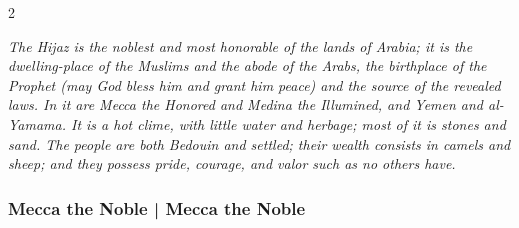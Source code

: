 \documentclass[11pt,a4paper]{article}
\begin{document}
\begin{paracol}{2}

\switchcolumn[0]
\begin{flushright}
{\small\arabicfont
{}}
\end{flushright}

\switchcolumn[1]
\begin{flushleft}
\small
\textit{The Hijaz is the noblest and most honorable of the lands of Arabia; it is the dwelling-place of the Muslims and the abode of the Arabs, the birthplace of the Prophet (may God bless him and grant him peace) and the source of the revealed laws. In it are Mecca the Honored and Medina the Illumined, and Yemen and al-Yamama. It is a hot clime, with little water and herbage; most of it is stones and sand. The people are both Bedouin and settled; their wealth consists in camels and sheep; and they possess pride, courage, and valor such as no others have.}
\end{flushleft}

\end{paracol}

\vspace{0.3cm}

\subsubsection{Mecca the Noble | Mecca the Noble}
\end{document}
